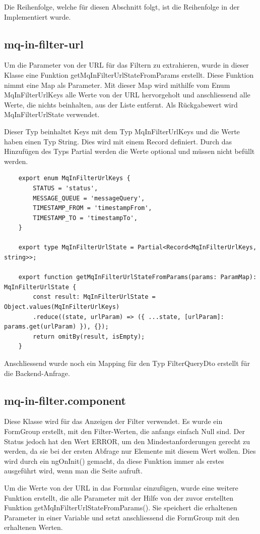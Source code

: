 Die Reihenfolge, welche für diesen Abschnitt folgt, ist die Reihenfolge in der Implementiert wurde.

\subsection{mq-in-filter-url}
Um die Parameter von der URL für das Filtern zu extrahieren, wurde in dieser Klasse eine Funktion getMqInFilterUrlStateFromParams erstellt. Diese Funktion nimmt eine Map als Parameter. Mit dieser Map wird mithilfe vom Enum MqInFilterUrlKeys alle Werte von der URL hervorgeholt und anschliessend alle Werte, die nichts beinhalten, aus der Liste entfernt. Als Rückgabewert wird MqInFilterUrlState verwendet.

Dieser Typ beinhaltet Keys mit dem Typ MqInFilterUrlKeys und die Werte haben einen Typ String. Dies wird mit einem Record definiert. Durch das Hinzufügen des Typs Partial werden die Werte optional und müssen nicht befüllt werden.

\begin{verbatim}
	export enum MqInFilterUrlKeys {
		STATUS = 'status',
		MESSAGE_QUEUE = 'messageQuery',
		TIMESTAMP_FROM = 'timestampFrom',
		TIMESTAMP_TO = 'timestampTo',
	}
	
	export type MqInFilterUrlState = Partial<Record<MqInFilterUrlKeys, string>>;
	
	export function getMqInFilterUrlStateFromParams(params: ParamMap): MqInFilterUrlState {
		const result: MqInFilterUrlState = Object.values(MqInFilterUrlKeys)
		.reduce((state, urlParam) => ({ ...state, [urlParam]: params.get(urlParam) }), {});
		return omitBy(result, isEmpty);
	}
\end{verbatim}

Anschliessend wurde noch ein Mapping für den Typ FilterQueryDto erstellt für die Backend-Anfrage.

\subsection{mq-in-filter.component}
Diese Klasse wird für das Anzeigen der Filter verwendet. Es wurde ein FormGroup erstellt, mit den Filter-Werten, die anfangs einfach Null sind. Der Status jedoch hat den Wert ERROR, um den Mindestanforderungen gerecht zu werden, da sie bei der ersten Abfrage nur Elemente mit diesem Wert wollen. Dies wird durch ein ngOnInit() gemacht, da diese Funktion immer als erstes ausgeführt wird, wenn man die Seite aufruft.

Um die Werte von der URL in das Formular einzufügen, wurde eine weitere Funktion erstellt, die alle Parameter mit der Hilfe von der zuvor erstellten Funktion getMqInFilterUrlStateFromParams(). Sie speichert die erhaltenen Parameter in einer Variable und setzt anschliessend die FormGroup mit den erhaltenen Werten.


